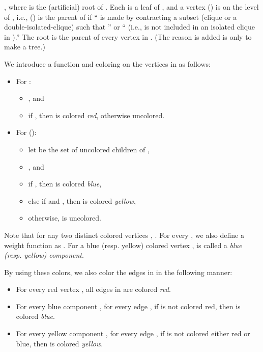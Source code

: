 \documentclass[11pt]{article}
\begin{document}
, 
where  is the (artificial) root of . 
Each  is a leaf of , and 
a vertex  () is on the level  of , 
i.e., 
 () is the parent of  
if `` is made by contracting a subset (clique or a double-isolated-clique) 
 such that '' or  
`` (i.e.,  is not included in an isolated clique in ).''
The root  is the parent of every vertex in . 
(The reason  is added is only to make  a tree.) 



We introduce a function 
and coloring on the vertices in  
as follows: 
\begin{itemize}
  \item For : 
  \begin{itemize}
    \item , and 
    \item if , then  is colored {\em red}, otherwise uncolored. 
  \end{itemize}
  \item For  (): 
  \begin{itemize}
      \item let  be the set of uncolored children of , 
      \item , and 
      \item if , then  is colored {\em blue}, 
      \item else if  and , then  is colored {\em yellow}, 
      \item otherwise,  is uncolored. 
  \end{itemize}
\end{itemize}









Note that for any two distinct colored vertices , 
. 
For every , we also define a weight function as 
. 
For a blue (resp. yellow) colored vertex , 
 is called a {\em blue (resp. yellow) component}. 


By using these colors, 
we also color the edges in  in the following manner: 
\begin{itemize}
\item For every red vertex , all edges in  are colored {\em red}. 
\item For every blue component , for every edge ,  
if  is not colored red, then  is colored {\em blue}. 
\item For every yellow component , for every edge ,  
if  is not colored either red or blue, 
then  is colored {\em yellow}. 
\end{itemize}
\end{document}
